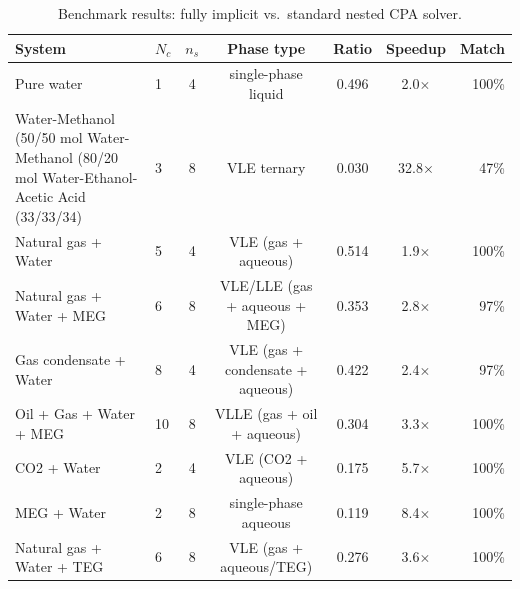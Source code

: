 \begin{table}[htbp]
\centering
\caption{Benchmark results: fully implicit vs.\ standard nested CPA solver.}
\label{tab:benchmark}
\begin{tabular}{llccccr}
\toprule
System & $N_c$ & $n_s$ & Phase type & Ratio & Speedup & Match \\
\midrule
Pure water & 1 & 4 & single-phase liquid & 0.496 & 2.0$\times$ & 100\% \\
Water-Methanol (50/50 mol%
Water-Methanol (80/20 mol%
Water-Ethanol-Acetic Acid (33/33/34) & 3 & 8 & VLE ternary & 0.030 & 32.8$\times$ & 47\% \\
Natural gas + Water & 5 & 4 & VLE (gas + aqueous) & 0.514 & 1.9$\times$ & 100\% \\
Natural gas + Water + MEG & 6 & 8 & VLE/LLE (gas + aqueous + MEG) & 0.353 & 2.8$\times$ & 97\% \\
Gas condensate + Water & 8 & 4 & VLE (gas + condensate + aqueous) & 0.422 & 2.4$\times$ & 97\% \\
Oil + Gas + Water + MEG & 10 & 8 & VLLE (gas + oil + aqueous) & 0.304 & 3.3$\times$ & 100\% \\
CO2 + Water & 2 & 4 & VLE (CO2 + aqueous) & 0.175 & 5.7$\times$ & 100\% \\
MEG + Water & 2 & 8 & single-phase aqueous & 0.119 & 8.4$\times$ & 100\% \\
Natural gas + Water + TEG & 6 & 8 & VLE (gas + aqueous/TEG) & 0.276 & 3.6$\times$ & 100\% \\
\bottomrule
\end{tabular}
\end{table}